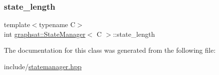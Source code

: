 \mbox{\label{classgraphsat_1_1_state_manager_a75440e91940c7228bcc3e275105c8dab}} 
\subsubsection{\texorpdfstring{state\_length}{state\_length}}
{\footnotesize\ttfamily template$<$typename C$>$ \\
int \mbox{\hyperlink{classgraphsat_1_1_state_manager}{graphsat\+::\+State\+Manager}}$<$ C $>$\+::state\+\_\+length\hspace{0.3cm}{\ttfamily [private]}}



The documentation for this class was generated from the following file\+:\begin{DoxyCompactItemize}
\item 
include/\mbox{\hyperlink{statemanager_8hpp}{statemanager.\+hpp}}\end{DoxyCompactItemize}
